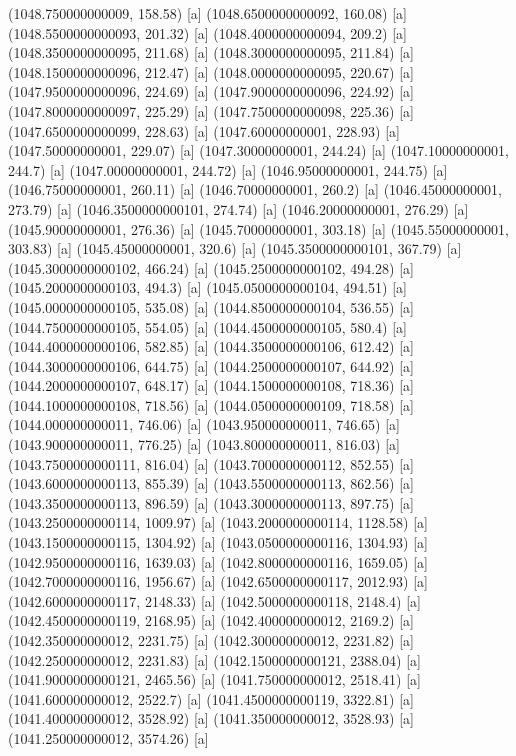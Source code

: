 {{{(1048.750000000009, 158.58) [a] 
(1048.6500000000092, 160.08) [a] 
(1048.5500000000093, 201.32) [a] 
(1048.4000000000094, 209.2) [a] 
(1048.3500000000095, 211.68) [a] 
(1048.3000000000095, 211.84) [a] 
(1048.1500000000096, 212.47) [a] 
(1048.0000000000095, 220.67) [a] 
(1047.9500000000096, 224.69) [a] 
(1047.9000000000096, 224.92) [a] 
(1047.8000000000097, 225.29) [a] 
(1047.7500000000098, 225.36) [a] 
(1047.6500000000099, 228.63) [a] 
(1047.60000000001, 228.93) [a] 
(1047.50000000001, 229.07) [a] 
(1047.30000000001, 244.24) [a] 
(1047.10000000001, 244.7) [a] 
(1047.00000000001, 244.72) [a] 
(1046.95000000001, 244.75) [a] 
(1046.75000000001, 260.11) [a] 
(1046.70000000001, 260.2) [a] 
(1046.45000000001, 273.79) [a] 
(1046.3500000000101, 274.74) [a] 
(1046.20000000001, 276.29) [a] 
(1045.90000000001, 276.36) [a] 
(1045.70000000001, 303.18) [a] 
(1045.55000000001, 303.83) [a] 
(1045.45000000001, 320.6) [a] 
(1045.3500000000101, 367.79) [a] 
(1045.3000000000102, 466.24) [a] 
(1045.2500000000102, 494.28) [a] 
(1045.2000000000103, 494.3) [a] 
(1045.0500000000104, 494.51) [a] 
(1045.0000000000105, 535.08) [a] 
(1044.8500000000104, 536.55) [a] 
(1044.7500000000105, 554.05) [a] 
(1044.4500000000105, 580.4) [a] 
(1044.4000000000106, 582.85) [a] 
(1044.3500000000106, 612.42) [a] 
(1044.3000000000106, 644.75) [a] 
(1044.2500000000107, 644.92) [a] 
(1044.2000000000107, 648.17) [a] 
(1044.1500000000108, 718.36) [a] 
(1044.1000000000108, 718.56) [a] 
(1044.0500000000109, 718.58) [a] 
(1044.000000000011, 746.06) [a] 
(1043.950000000011, 746.65) [a] 
(1043.900000000011, 776.25) [a] 
(1043.800000000011, 816.03) [a] 
(1043.7500000000111, 816.04) [a] 
(1043.7000000000112, 852.55) [a] 
(1043.6000000000113, 855.39) [a] 
(1043.5500000000113, 862.56) [a] 
(1043.3500000000113, 896.59) [a] 
(1043.3000000000113, 897.75) [a] 
(1043.2500000000114, 1009.97) [a] 
(1043.2000000000114, 1128.58) [a] 
(1043.1500000000115, 1304.92) [a] 
(1043.0500000000116, 1304.93) [a] 
(1042.9500000000116, 1639.03) [a] 
(1042.8000000000116, 1659.05) [a] 
(1042.7000000000116, 1956.67) [a] 
(1042.6500000000117, 2012.93) [a] 
(1042.6000000000117, 2148.33) [a] 
(1042.5000000000118, 2148.4) [a] 
(1042.4500000000119, 2168.95) [a] 
(1042.400000000012, 2169.2) [a] 
(1042.350000000012, 2231.75) [a] 
(1042.300000000012, 2231.82) [a] 
(1042.250000000012, 2231.83) [a] 
(1042.1500000000121, 2388.04) [a] 
(1041.9000000000121, 2465.56) [a] 
(1041.750000000012, 2518.41) [a] 
(1041.600000000012, 2522.7) [a] 
(1041.4500000000119, 3322.81) [a] 
(1041.400000000012, 3528.92) [a] 
(1041.350000000012, 3528.93) [a] 
(1041.250000000012, 3574.26) [a] 
}}}
